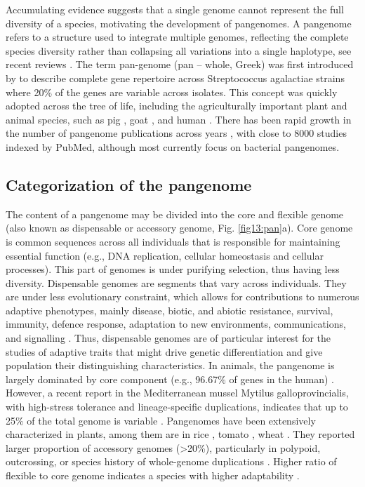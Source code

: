 \documentclass[../main.tex]{subfiles}
\begin{document}
Accumulating evidence suggests that a single genome cannot represent  the full diversity of a species, motivating the development of  pangenomes. A pangenome refers to a structure used to  integrate multiple genomes, reflecting the complete species diversity rather than collapsing all variations into a single haplotype, see recent reviews \citep{bayer2020plant,goliczgolicz2020pangenomics,sherman2020pan,della2021pan}. The term pan-genome (pan – whole, Greek) was first introduced by \citet{tettelin2005genome} to describe complete gene repertoire across Streptococcus agalactiae strains where 20\% of the genes are variable across isolates. This concept was quickly adopted across the tree of life, including the agriculturally important plant and animal species, such as pig \citep{li2017comprehensive,tian2019building}, goat \citep{li2019towards}, and human \citep{duan2019hupan,sherman2019assembly}. There has been rapid growth in the number of pangenome publications across years \citep{bayer2020plant}, with close to 8000 studies indexed by PubMed,  although most currently focus on bacterial pangenomes.  

\subsection{Categorization of the pangenome}

The content of a pangenome may be divided into the core and flexible genome (also known  as dispensable or accessory genome, Fig. \ref{fig13:pan}a). Core genome is common sequences across all individuals that is responsible for maintaining essential function (e.g., DNA replication, cellular homeostasis and cellular processes). This part of genomes is under purifying selection, thus having less diversity. Dispensable genomes are segments that vary across individuals. They are under less evolutionary constraint, which allows for contributions to numerous adaptive phenotypes, mainly disease, biotic, and abiotic resistance, survival, immunity, defence response, adaptation to new environments, communications, and signalling \citep{golicz2020pangenomics}. Thus, dispensable genomes are of particular interest for the studies of adaptive traits that might drive genetic differentiation and give population their distinguishing characteristics. In animals, the pangenome is largely dominated by core component (e.g., 96.67\% of genes in the human) \citep{duan2019hupan}. However, a recent report in the Mediterranean mussel Mytilus galloprovincialis, with high-stress tolerance and lineage-specific duplications, indicates that up to 25\% of the total genome is variable \citep{gerdol2020massive}. Pangenomes have been extensively characterized in plants, among them are in rice \citep{zhao2018pan}, tomato \citep{gao2019tomato}, wheat \citep{walkowiak2020multiple}. They reported larger proportion of accessory genomes (>20\%), particularly in polypoid, outcrossing, or species history of whole-genome duplications \citep{tao2019exploring}. Higher ratio of flexible to core genome indicates a species with higher adaptability \citep{tranchant2018plant}. 
\end{document}

